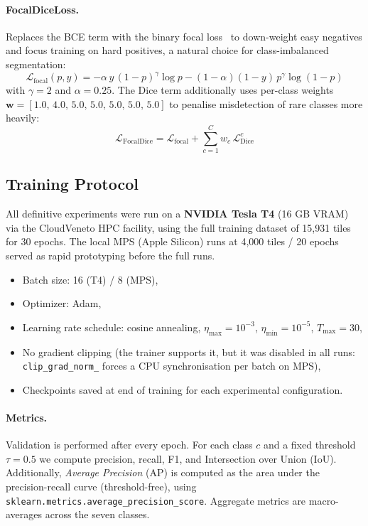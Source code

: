 \paragraph{FocalDiceLoss.}
Replaces the BCE term with the binary focal loss~\cite{lin2017focal} to down-weight easy negatives and focus training on hard positives, a natural choice for class-imbalanced segmentation:
\[
\mathcal{L}_{\text{focal}}(p,y) = -\alpha\,y\,(1-p)^\gamma \log p
                                   -(1-\alpha)(1-y)\,p^\gamma \log(1-p)
\]
with $\gamma=2$ and $\alpha=0.25$. The Dice term additionally uses per-class weights $\mathbf{w} = [1.0,\,4.0,\,5.0,\,5.0,\,5.0,\,5.0,\,5.0]$ to penalise misdetection of rare classes more heavily:
\[
\mathcal{L}_{\text{FocalDice}} = \mathcal{L}_{\text{focal}} + \sum_{c=1}^{C} w_c \,\mathcal{L}_{\text{Dice}}^c
\]

\subsection{Training Protocol}
\label{sec:mr_training}

All definitive experiments were run on a \textbf{NVIDIA Tesla T4} (16 GB VRAM) via the CloudVeneto HPC facility, using the full training dataset of 15{,}931 tiles for 30 epochs. The local MPS (Apple Silicon) runs at 4{,}000 tiles / 20 epochs served as rapid prototyping before the full runs.

\begin{itemize}
    \item Batch size: 16 (T4) / 8 (MPS),
    \item Optimizer: Adam,
    \item Learning rate schedule: cosine annealing, $\eta_{\max}=10^{-3}$, $\eta_{\min}=10^{-5}$, $T_{\max}=30$,
    \item No gradient clipping (the trainer supports it, but it was disabled in all runs: \texttt{clip\_grad\_norm\_} forces a CPU synchronisation per batch on MPS),
    \item Checkpoints saved at end of training for each experimental configuration.
\end{itemize}

\paragraph{Metrics.}
Validation is performed after every epoch. For each class $c$ and a fixed threshold $\tau=0.5$ we compute precision, recall, F1, and Intersection over Union (IoU). Additionally, \textit{Average Precision} (AP) is computed as the area under the precision-recall curve (threshold-free), using \texttt{sklearn.metrics.average\_precision\_score}. Aggregate metrics are macro-averages across the seven classes.

